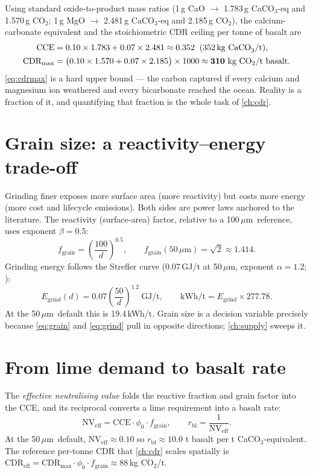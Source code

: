 \documentclass[openany]{book}
\newcommand{\co}{\ensuremath{\mathrm{CO_2}}}
\newcommand{\um}{\ensuremath{\mu\mathrm{m}}}
\begin{document}
Using standard oxide-to-product mass ratios (1\,g CaO $\rightarrow$ 1.783\,g
CaCO$_3$-eq and 1.570\,g \co; 1\,g MgO $\rightarrow$ 2.481\,g CaCO$_3$-eq and
2.185\,g \co), the calcium-carbonate equivalent and the stoichiometric CDR
ceiling per tonne of basalt are
%
\begin{align}
\mathrm{CCE} &= 0.10\times 1.783 + 0.07\times 2.481 \approx 0.352
  \;\;(\text{352\,kg CaCO}_3/\text{t}), \label{eq:cce}\\
\mathrm{CDR_{max}} &= \big(0.10\times 1.570 + 0.07\times 2.185\big)\times 1000
  \approx \mathbf{310}\ \text{kg \co/t basalt}. \label{eq:cdrmax}
\end{align}
%
\autoref{eq:cdrmax} is a hard upper bound --- the carbon captured if every
calcium and magnesium ion weathered and every bicarbonate reached the ocean.
Reality is a fraction of it, and quantifying that fraction is the whole task of
\autoref{ch:cdr}.

\section{Grain size: a reactivity--energy trade-off}

Grinding finer exposes more surface area (more reactivity) but costs more energy
(more cost and lifecycle emissions). Both sides are power laws anchored to the
literature. The reactivity (surface-area) factor, relative to a 100\,\um\
reference, uses exponent $\beta=0.5$:
%
\begin{equation}
f_{\text{grain}} = \left(\frac{100}{d}\right)^{0.5},
\qquad f_{\text{grain}}(50\,\um) = \sqrt{2}\approx 1.414.
\label{eq:grain}
\end{equation}
%
Grinding energy follows the Strefler curve (0.07\,GJ/t at 50\,\um, exponent
$\alpha=1.2$; \citealp{strefler2018}):
%
\begin{equation}
E_{\text{grind}}(d) = 0.07\left(\frac{50}{d}\right)^{1.2}\ \text{GJ/t},
\qquad \text{kWh/t} = E_{\text{grind}}\times 277.78.
\label{eq:grind}
\end{equation}
%
At the 50\,\um\ default this is 19.4\,kWh/t. Grain size is a decision variable
precisely because \autoref{eq:grain} and \autoref{eq:grind} pull in opposite
directions; \autoref{ch:supply} sweeps it.

\section{From lime demand to basalt rate}

The \emph{effective neutralising value} folds the reactive fraction and grain
factor into the CCE, and its reciprocal converts a lime requirement into a
basalt rate:
%
\begin{equation}
\mathrm{NV_{eff}} = \mathrm{CCE}\cdot\phi_0\cdot f_{\text{grain}},
\qquad r_{\text{bl}} = \frac{1}{\mathrm{NV_{eff}}}.
\label{eq:nv}
\end{equation}
%
At the 50\,\um\ default, $\mathrm{NV_{eff}}\approx 0.10$ so
$r_{\text{bl}}\approx 10.0$ t basalt per t CaCO$_3$-equivalent. The reference
per-tonne CDR that \autoref{ch:cdr} scales spatially is
$\mathrm{CDR_{eff}} = \mathrm{CDR_{max}}\cdot\phi_0\cdot f_{\text{grain}}
\approx 88$\,kg \co/t.
\end{document}
